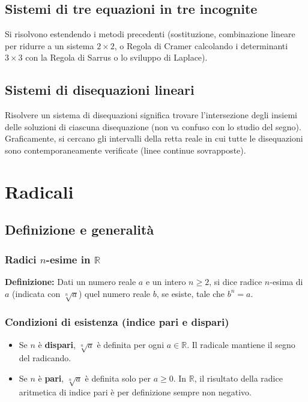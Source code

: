 \subsection{Sistemi di tre equazioni in tre incognite}
Si risolvono estendendo i metodi precedenti (sostituzione, combinazione lineare per ridurre a un sistema $2 \times 2$, o Regola di Cramer calcolando i determinanti $3 \times 3$ con la Regola di Sarrus o lo sviluppo di Laplace).

\subsection{Sistemi di disequazioni lineari}
Risolvere un sistema di disequazioni significa trovare l'intersezione degli insiemi delle soluzioni di ciascuna disequazione (non va confuso con lo studio del segno). Graficamente, si cercano gli intervalli della retta reale in cui tutte le disequazioni sono contemporaneamente verificate (linee continue sovrapposte).

\section{Radicali}
\subsection{Definizione e generalità}
\subsubsection{Radici $n$-esime in $\mathbb{R}$}
\textbf{Definizione:} Dati un numero reale $a$ e un intero $n \ge 2$, si dice radice $n$-esima di $a$ (indicata con $\sqrt[n]{a}$) quel numero reale $b$, se esiste, tale che $b^n = a$.

\subsubsection{Condizioni di esistenza (indice pari e dispari)}
\begin{itemize}
    \item Se $n$ è \textbf{dispari}, $\sqrt[n]{a}$ è definita per ogni $a \in \mathbb{R}$. Il radicale mantiene il segno del radicando.
    \item Se $n$ è \textbf{pari}, $\sqrt[n]{a}$ è definita solo per $a \ge 0$. In $\mathbb{R}$, il risultato della radice aritmetica di indice pari è per definizione sempre non negativo.
\end{itemize}

